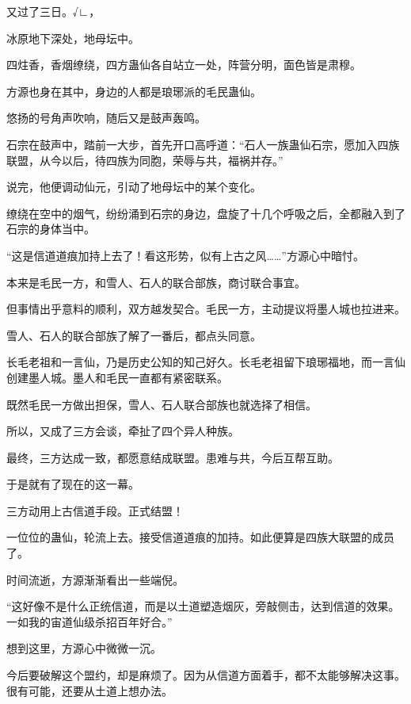 
\begin{this_body}



又过了三日。√∟，

冰原地下深处，地母坛中。

四炷香，香烟缭绕，四方蛊仙各自站立一处，阵营分明，面色皆是肃穆。

方源也身在其中，身边的人都是琅琊派的毛民蛊仙。

悠扬的号角声吹响，随后又是鼓声轰鸣。

石宗在鼓声中，踏前一大步，首先开口高呼道：“石人一族蛊仙石宗，愿加入四族联盟，从今以后，待四族为同胞，荣辱与共，福祸并存。”

说完，他便调动仙元，引动了地母坛中的某个变化。

缭绕在空中的烟气，纷纷涌到石宗的身边，盘旋了十几个呼吸之后，全都融入到了石宗的身体当中。

“这是信道道痕加持上去了！看这形势，似有上古之风……”方源心中暗忖。

本来是毛民一方，和雪人、石人的联合部族，商讨联合事宜。

但事情出乎意料的顺利，双方越发契合。毛民一方，主动提议将墨人城也拉进来。

雪人、石人的联合部族了解了一番后，都点头同意。

长毛老祖和一言仙，乃是历史公知的知己好久。长毛老祖留下琅琊福地，而一言仙创建墨人城。墨人和毛民一直都有紧密联系。

既然毛民一方做出担保，雪人、石人联合部族也就选择了相信。

所以，又成了三方会谈，牵扯了四个异人种族。

最终，三方达成一致，都愿意结成联盟。患难与共，今后互帮互助。

于是就有了现在的这一幕。

三方动用上古信道手段。正式结盟！

一位位的蛊仙，轮流上去。接受信道道痕的加持。如此便算是四族大联盟的成员了。

时间流逝，方源渐渐看出一些端倪。

“这好像不是什么正统信道，而是以土道塑造烟灰，旁敲侧击，达到信道的效果。一如我的宙道仙级杀招百年好合。”

想到这里，方源心中微微一沉。

今后要破解这个盟约，却是麻烦了。因为从信道方面着手，都不太能够解决这事。很有可能，还要从土道上想办法。


\end{this_body}
